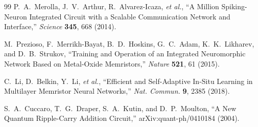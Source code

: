 \documentclass[11pt,twocolumn]{article}
\theoremstyle{definition}
\theoremstyle{remark}
\begin{document}
\begin{thebibliography}{99}
P.~A.~Merolla, J.~V.~Arthur, R.~Alvarez-Icaza, \textit{et al.},
``A Million Spiking-Neuron Integrated Circuit with a Scalable
Communication Network and Interface,'' \textit{Science} \textbf{345},
668 (2014).

M.~Prezioso, F.~Merrikh-Bayat, B.~D.~Hoskins, G.~C.~Adam,
K.~K.~Likharev, and D.~B.~Strukov, ``Training and Operation of an
Integrated Neuromorphic Network Based on Metal-Oxide Memristors,''
\textit{Nature} \textbf{521}, 61 (2015).

C.~Li, D.~Belkin, Y.~Li, \textit{et al.}, ``Efficient and
Self-Adaptive In-Situ Learning in Multilayer Memristor Neural Networks,''
\textit{Nat. Commun.} \textbf{9}, 2385 (2018).

S.~A.~Cuccaro, T.~G.~Draper, S.~A.~Kutin, and D.~P.~Moulton,
``A New Quantum Ripple-Carry Addition Circuit,'' arXiv:quant-ph/0410184
(2004).

\end{thebibliography}
\end{document}
